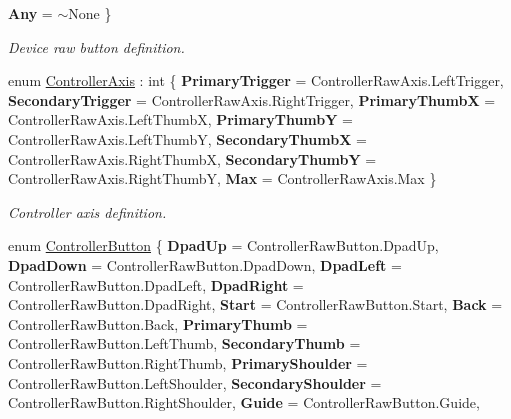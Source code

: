 \begin{DoxyCompactItemize}
\newline
{\bfseries Any} = $\sim$\+None
 \}
\begin{DoxyCompactList}\small\item\em Device raw button definition. \end{DoxyCompactList}\item 
\mbox{\label{namespace_ximmerse_1_1_input_system_a44e24f3c450acce9e842c4b4bc9464d2}} 
enum \mbox{\hyperlink{namespace_ximmerse_1_1_input_system_a44e24f3c450acce9e842c4b4bc9464d2}{Controller\+Axis}} \+: int \{ \newline
{\bfseries Primary\+Trigger} = Controller\+Raw\+Axis.\+Left\+Trigger, 
{\bfseries Secondary\+Trigger} = Controller\+Raw\+Axis.\+Right\+Trigger, 
{\bfseries Primary\+ThumbX} = Controller\+Raw\+Axis.\+Left\+ThumbX, 
{\bfseries Primary\+ThumbY} = Controller\+Raw\+Axis.\+Left\+ThumbY, 
\newline
{\bfseries Secondary\+ThumbX} = Controller\+Raw\+Axis.\+Right\+ThumbX, 
{\bfseries Secondary\+ThumbY} = Controller\+Raw\+Axis.\+Right\+ThumbY, 
{\bfseries Max} = Controller\+Raw\+Axis.\+Max
 \}
\begin{DoxyCompactList}\small\item\em Controller axis definition. \end{DoxyCompactList}\item 
\mbox{\label{namespace_ximmerse_1_1_input_system_a7a8cc40f03a0a633525130da50d60efe}} 
enum \mbox{\hyperlink{namespace_ximmerse_1_1_input_system_a7a8cc40f03a0a633525130da50d60efe}{Controller\+Button}} \{ \newline
{\bfseries Dpad\+Up} = Controller\+Raw\+Button.\+Dpad\+Up, 
{\bfseries Dpad\+Down} = Controller\+Raw\+Button.\+Dpad\+Down, 
{\bfseries Dpad\+Left} = Controller\+Raw\+Button.\+Dpad\+Left, 
{\bfseries Dpad\+Right} = Controller\+Raw\+Button.\+Dpad\+Right, 
\newline
{\bfseries Start} = Controller\+Raw\+Button.\+Start, 
{\bfseries Back} = Controller\+Raw\+Button.\+Back, 
{\bfseries Primary\+Thumb} = Controller\+Raw\+Button.\+Left\+Thumb, 
{\bfseries Secondary\+Thumb} = Controller\+Raw\+Button.\+Right\+Thumb, 
\newline
{\bfseries Primary\+Shoulder} = Controller\+Raw\+Button.\+Left\+Shoulder, 
{\bfseries Secondary\+Shoulder} = Controller\+Raw\+Button.\+Right\+Shoulder, 
{\bfseries Guide} = Controller\+Raw\+Button.\+Guide, 

\end{DoxyCompactItemize}
